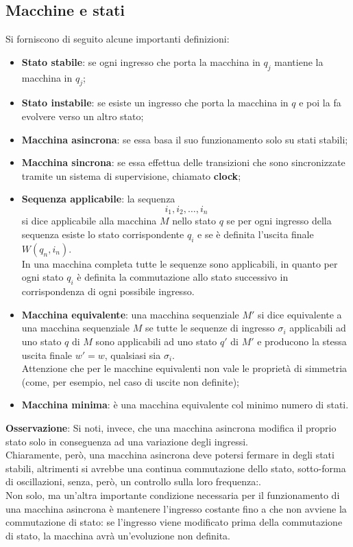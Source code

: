 \documentclass[a4paper]{extarticle}
\begin{document}
\subsection{Macchine e stati}
Si forniscono di seguito alcune importanti definizioni:
\begin{itemize}
    \item \textbf{Stato stabile}: se ogni ingresso che porta la macchina in $q_j$ mantiene la macchina in $q_j$;
    \item \textbf{Stato instabile}: se esiste un ingresso che porta la macchina in $q$ e poi la fa evolvere verso un altro stato;
    \item \textbf{Macchina asincrona}: se essa basa il suo funzionamento solo su stati stabili;
    \item \textbf{Macchina sincrona}: se essa effettua delle transizioni che sono sincronizzate tramite un sistema di supervisione, chiamato \textbf{clock};
    \item \textbf{Sequenza applicabile}: la sequenza
    \[i_1,i_2,\dots,i_n\]
    si dice applicabile alla macchina $M$ nello stato $q$ se per ogni ingresso della sequenza esiste lo stato corrispondente $q_i$ e se è definita l'uscita finale $W(q_n,i_n)$.\\
    In una macchina completa tutte le sequenze sono applicabili, in quanto per ogni stato $q_i$ è definita la commutazione allo stato successivo in corrispondenza di ogni possibile ingresso.
    \item \textbf{Macchina equivalente}: una macchina sequenziale $M'$ si dice equivalente a una macchina sequenziale $M$ se tutte le sequenze di ingresso $\sigma_i$ applicabili ad uno stato $q$ di $M$ sono applicabili ad uno stato $q'$ di $M'$ e producono la stessa uscita finale $w' = w$, qualsiasi sia $\sigma_i$.\\
    Attenzione che per le macchine equivalenti non vale le proprietà di simmetria (come, per esempio, nel caso di uscite non definite);
    \item \textbf{Macchina minima}: è una macchina equivalente col minimo numero di stati.
\end{itemize}

\vspace{1em}
\noindent
\textbf{Osservazione}: Si noti, invece, che una macchina asincrona modifica il proprio stato solo in conseguenza ad una variazione degli ingressi.\\
Chiaramente, però, una macchina asincrona deve potersi fermare in degli stati stabili, altrimenti si avrebbe una continua commutazione dello stato, sotto-forma di oscillazioni, senza, però, un controllo sulla loro frequenza:.\\
Non solo, ma un'altra importante condizione necessaria per il funzionamento di una macchina asincrona è mantenere l'ingresso costante fino a che non avviene la commutazione di stato: se l'ingresso viene modificato prima della commutazione di stato, la macchina avrà un'evoluzione non definita.
\end{document}
